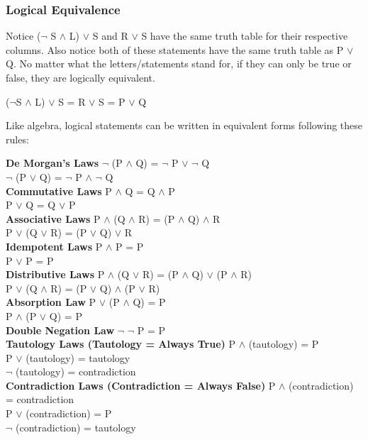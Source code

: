 \documentclass[11pt]{article}
\theoremstyle{definition}
\theoremstyle{remark}
\begin{document}
\subsubsection{Logical Equivalence}
Notice ($\neg$ S $\land$ L) $\lor$ S and R $\lor$ S have the same truth table for their respective columns. Also notice both of these statements have the same truth table as P $\lor$ Q.
No matter what the letters/statements stand for, if they can only be true or false, they are logically equivalent.
\begin{center}
($\neg$S $\land$ L) $\lor$ S = R $\lor$ S = P $\lor$ Q
\end{center}

Like algebra, logical statements can be written in equivalent forms following these rules:
\begin{shaded}
\textbf{De Morgan's Laws}\newline
$\neg$ (P $\land$ Q) = $\neg$ P $\lor$ $\neg$ Q\\
$\neg$ (P $\lor$ Q) = $\neg$ P $\land$ $\neg$ Q \\
\textbf{Commutative Laws} \newline
P $\land$ Q = Q $\land$ P \\
P $\lor$ Q = Q $\lor$ P\\
\textbf{Associative Laws} \newline
P $\land$ (Q $\land$ R) = (P $\land$ Q) $\land$ R\\
P $\lor$ (Q $\lor$ R) = (P $\lor$ Q) $\lor$ R \\
\textbf{Idempotent Laws} \newline
P $\land$ P = P \\
P $\lor$ P = P \\
\textbf{Distributive Laws} \newline
P $\land$ (Q $\lor$ R) = (P $\land$ Q) $\lor$ (P $\land$ R) \\
P $\lor$ (Q $\land$ R) = (P $\lor$ Q) $\land$ (P $\lor$ R)\\
\textbf{Absorption Law} \newline
P $\lor$ (P $\land$ Q) = P \\
P $\land$ (P $\lor$ Q) = P \\
\textbf{Double Negation Law} \newline
$\neg$ $\neg$ P = P \\
\textbf{Tautology Laws (Tautology = Always True)} \newline
P $\land$ (tautology) = P \\
P $\lor$ (tautology) = tautology \\
$\neg$ (tautology) = contradiction \\
\textbf{Contradiction Laws (Contradiction = Always False)} \newline
P $\land$ (contradiction) = contradiction \\
P $\lor$ (contradiction) = P \\
$\neg$ (contradiction) = tautology
\end{shaded}
\end{document}
